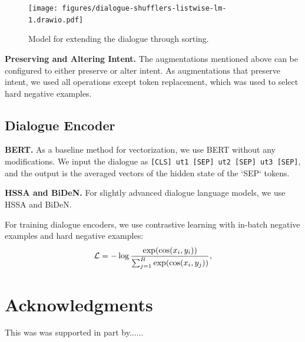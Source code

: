 \documentclass{article}
\begin{document}
\begin{figure}[!htb]
    \centering
    \texttt{[image: figures/dialogue-shufflers-listwise-lm-1.drawio.pdf]}
    \caption{Model for extending the dialogue through sorting.}
    \label{fig:listwise}
\end{figure}

\textbf{Preserving and Altering Intent.} The augmentations mentioned above can be configured to either preserve or alter intent. As augmentations that preserve intent, we used all operations except token replacement, which was used to select hard negative examples.

\subsection{Dialogue Encoder}

\textbf{BERT.} As a baseline method for vectorization, we use BERT without any modifications. We input the dialogue as \texttt{[CLS] ut1 [SEP] ut2 [SEP] ut3 [SEP]}, and the output is the averaged vectors of the hidden state of the `SEP` tokens.

\textbf{HSSA and BiDeN.} For slightly advanced dialogue language models, we use HSSA and BiDeN.

For training dialogue encoders, we use contrastive learning with in-batch negative examples and hard negative examples:
$$
\mathcal{L}=-\log{\exp(\cos(x_i,y_i))\over\sum_{j=1}^B\exp(\cos(x_i,y_j))},
$$


\section*{Acknowledgments}
This was was supported in part by......

  
  
\end{document}
